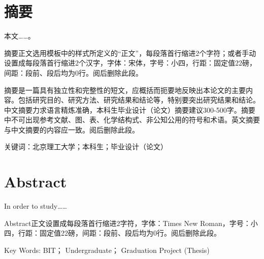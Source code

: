 %
%
%
%
%
%

\topskip=0pt

\vspace*{-7mm}

\begin{center}
  \heiti{}\textbf{\thesisTitle}
\end{center}

{\let\clearpage\relax \chapter*{摘\quad 要}}
\setcounter{page}{1}

\vspace*{1mm}

\setlength{\parskip}{0em}
本文……。

摘要正文选用模板中的样式所定义的“正文”，每段落首行缩进2个字符；或者手动设置成每段落首行缩进2个汉字，字体：宋体，字号：小四，行距：固定值22磅，间距：段前、段后均为0行。阅后删除此段。

摘要是一篇具有独立性和完整性的短文，应概括而扼要地反映出本论文的主要内容。包括研究目的、研究方法、研究结果和结论等，特别要突出研究结果和结论。中文摘要力求语言精炼准确，本科生毕业设计（论文）摘要建议300-500字。摘要中不可出现参考文献、图、表、化学结构式、非公知公用的符号和术语。英文摘要与中文摘要的内容应一致。阅后删除此段。

关键词：北京理工大学；本科生；毕业设计（论文）
\newpage

\topskip=0pt

\vspace*{0mm}

\begin{spacing}{1}
  \centering
  \heiti{}\textbf{\thesisTitleEN}
\end{spacing}

\vspace*{12mm}

{\let\clearpage\relax \chapter*{Abstract}}
\setcounter{page}{2}

\setlength{\parskip}{0em}
In order to study……

Abstract正文设置成每段落首行缩进2字符，字体：Times New Roman，字号：小四，行距：固定值22磅，间距：段前、段后均为0行。阅后删除此段。

Key Words: BIT； Undergraduate； Graduation Project (Thesis)
\newpage
